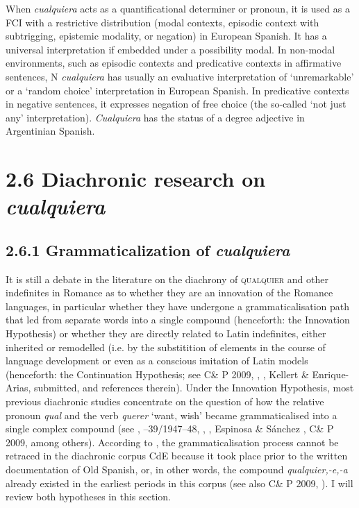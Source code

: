 When \textit{cualquiera} acts as a quantificational determiner or pronoun, it is used as a FCI with a restrictive distribution (modal contexts, episodic context with subtrigging, epistemic modality, or negation) in European Spanish. It has a universal interpretation if embedded under a possibility modal. In non-modal environments, such as episodic contexts and predicative contexts in affirmative sentences, N \textit{cualquiera} has usually an evaluative interpretation of ‘unremarkable’ or a ‘random choice’ interpretation in European Spanish. In predicative contexts in negative sentences, it expresses negation of free choice (the so-called ‘not just any’ interpretation). \textit{Cualquiera} has the status of a degree adjective in Argentinian Spanish.

\section{\textbf{2.6} \textbf{Diachronic} \textbf{research} \textbf{on} \textbf{\textit{cualquiera}}}
\subsection{\textbf{2.6.1} \textbf{Grammaticalization} \textbf{of} \textbf{\textit{cualquiera}} }

It is still a debate in the literature on the diachrony of \textsc{qualquier} and other indefinites in Romance as to whether they are an innovation of the Romance languages, in particular whether they have undergone a grammaticalisation path that led from separate words into a single compound (henceforth: the Innovation Hypothesis) or whether they are directly related to Latin indefinites, either inherited or remodelled (i.e. by the substitition of elements in the course of language development or even as a conscious imitation of Latin models (henceforth: the Continuation Hypothesis; see C\& P 2009, \citealt{Pato2012}, \citealt{Mackenzie2019}, Kellert \& Enrique-Arias, submitted, and references therein). Under the Innovation Hypothesis, most previous diachronic studies concentrate on the question of how the relative pronoun \textit{qual} and the verb \textit{querer} ‘want, wish’ became grammaticalised into a single complex compound (see \citealt{Palomo1934}, \citealt{Lombard1938}–39/1947–48, \citealt{Meier1950}, \citealt{Rivero1988}, Espinosa \& Sánchez \citealt{Lancis2006}, C\& P 2009, among others). According to \citet{AloniEtAl2010}, the grammaticalisation process cannot be retraced in the diachronic corpus CdE because it took place prior to the written documentation of Old Spanish, or, in other words, the compound \textit{qualquier,\nobreakdash-e,\nobreakdash-a} already existed in the earliest periods in this corpus (see also C\& P 2009, \citealt{Rivero1988}). I will review both hypotheses in this section.

